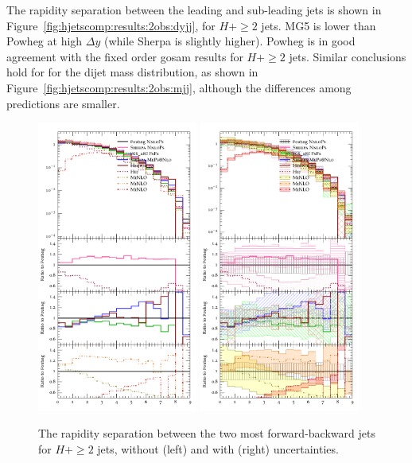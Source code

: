 The rapidity separation between the leading and sub-leading jets is
shown in Figure~\ref{fig:hjetscomp:results:2obs:dyjj}, for $H+\ge2$
jets. MG5 is lower than Powheg at high $\Delta y$ (while Sherpa is
slightly higher).  Powheg is in good agreement with the fixed order
gosam results for $H+\ge2$ jets. Similar conclusions hold for for the
dijet mass distribution, as shown in
Figure~\ref{fig:hjetscomp:results:2obs:mjj}, although the differences
among predictions are smaller.

\begin{figure}[t!]
  \centering
  \includegraphics[width=0.47\textwidth]{figures/hjetscomp_u_jjfb_dy.pdf}
  \hfill
  \includegraphics[width=0.47\textwidth]{figures/hjetscomp_jjfb_dy.pdf}
  \caption{\label{fig:hjetscomp:results:2obs:dyjj_fb}%
    The rapidity separation between the two most forward-backward jets
    for $H+\ge2$ jets, without (left) and with (right) uncertainties.
    }
\end{figure}

